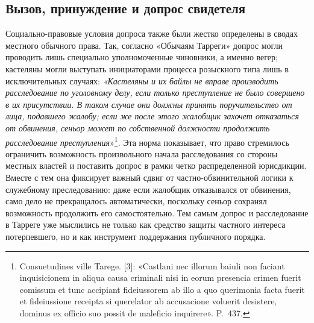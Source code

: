 \subsection{Вызов, принуждение и допрос свидетеля}

Социально-правовые условия допроса также были жестко определены в сводах местного обычного права. Так, согласно «Обычаям Тарреги» допрос могли проводить лишь специально уполномоченные чиновники, а именно вегер; кастеляны могли выступать инициаторами процесса розыскного типа лишь в исключительных случаях: \emph{«Кастеляны и их }\emph{байлы}\emph{ не вправе производить расследование по уголовному делу, если только преступление не было совершено в их присутствии. В таком случае они должны принять поручительство от лица, подавшего жалобу; если же после этого жалобщик захочет отказаться от обвинения, сеньор может по собственной должности продолжить расследование }\emph{преступления}»\footnote{Consuetudines ville Tarege. [3]: «Castlani nec illorum baiuli non faciant inquisicionem in aliqua causa criminali nisi in eorum presencia crimen fuerit comissum et tunc accipiant fideiussorem ab illo a quo querimonia facta fuerit et fideiussione receipta si querelator ab accusacione voluerit desistere, dominus ex officio suo possit de maleficio inquirere». P.~437.}. Эта норма показывает, что право стремилось ограничить возможность произвольного начала расследования со стороны местных властей и поставить допрос в рамки четко распределенной юрисдикции. Вместе с тем она фиксирует важный сдвиг от частно-обвинительной логики к служебному преследованию: даже если жалобщик отказывался от обвинения, само дело не прекращалось автоматически, поскольку сеньор сохранял возможность продолжить его самостоятельно. Тем самым допрос и расследование в Тарреге уже мыслились не только как средство защиты частного интереса потерпевшего, но и как инструмент поддержания публичного порядка.

